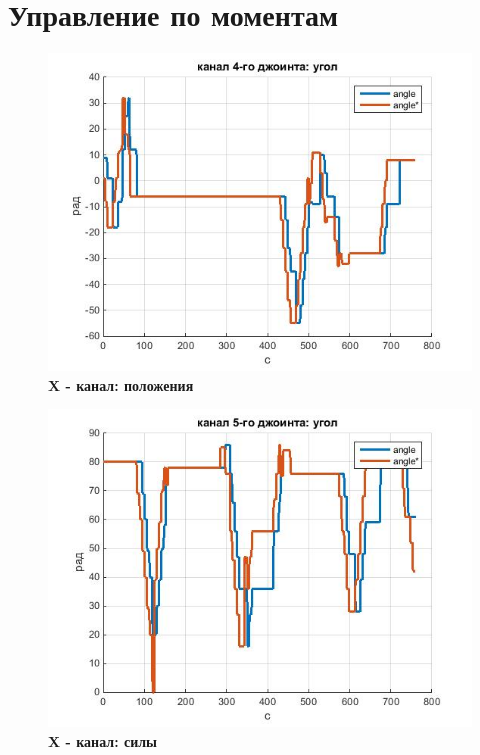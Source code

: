 \documentclass[a4paper,14pt,russian]{extreport} \usepackage{extsizes}
\begin{document}
	\section{Управление по моментам}
	\begin{figure}[h]
		\centering		 
		\includegraphics[width=5.5in]{./graph/j4.jpg}	
		\caption{
			\textbf{X - канал: положения}
		}     
		\label{fig_img51}
	\end{figure}
	\begin{figure}[h]
		\centering		 
		\includegraphics[width=5.5in]{./graph/j5.jpg}	
		\caption{
			\textbf{X - канал: силы}
		}
		\label{fig_img52}
	\end{figure}
\end{document}
